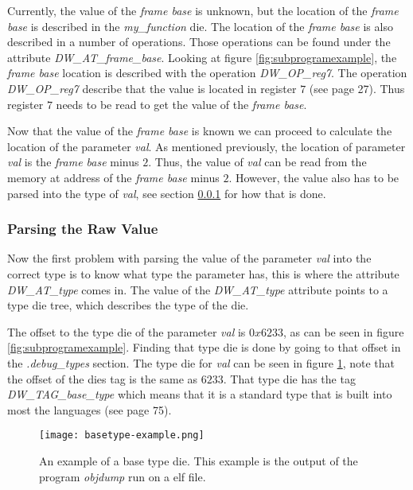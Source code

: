 Currently, the value of the \emph{frame base} is unknown, but the location of the \emph{frame base}  is described in the \emph{my\_function} \gls{die}.
The location of the \emph{frame base} is also described in a number of operations.
Those operations can be found under the attribute \emph{DW\_AT\_frame\_base}.
Looking at figure \ref{fig:subprogramexample}, the \emph{frame base} location is described with the operation \emph{DW\_OP\_reg7}.
The operation \emph{DW\_OP\_reg7} describe that the value is located in register $7$ (see \cite{dwarf} page 27).
Thus register $7$ needs to be read to get the value of the \emph{frame base}.


Now that the value of the \emph{frame base} is known we can proceed to calculate the location of the parameter \emph{val}.
As mentioned previously, the location of parameter \emph{val} is the \emph{frame base} minus $2$.
Thus, the value of \emph{val} can be read from the memory at address of the \emph{frame base} minus $2$.
However, the value also has to be parsed into the type of \emph{val}, see section \ref{sec:parsingvalue} for how that is done.


\subsubsection{Parsing the Raw Value} \label{sec:parsingvalue}
Now the first problem with parsing the value of the parameter \emph{val} into the correct type is to know what type the parameter has, this is where the attribute \emph{DW\_AT\_type} comes in.
The value of the \emph{DW\_AT\_type} attribute points to a type \gls{die} tree, which describes the type of the \gls{die}.


The offset to the type \gls{die} of the parameter \emph{val} is $0x6233$, as can be seen in figure \ref{fig:subprogramexample}.
Finding that type \gls{die} is done by going to that offset in the \emph{.debug\_types} section.
The type \gls{die} for \emph{val} can be seen in figure \ref{fig:basetypeexample}, note that the offset of the \glspl{die} tag is the same as $6233$.
That type \gls{die} has the tag \emph{DW\_TAG\_base\_type} which means that it is a standard type that is built into most the languages (see \cite{dwarf} page 75).


\begin{figure}[h]
	\centering
	\texttt{[image: basetype-example.png]}
	\caption{An example of a base type \gls{die}. This example is the output of the program \emph{objdump} run on a \gls{elf} file.}
	\label{fig:basetypeexample}
\end{figure}


